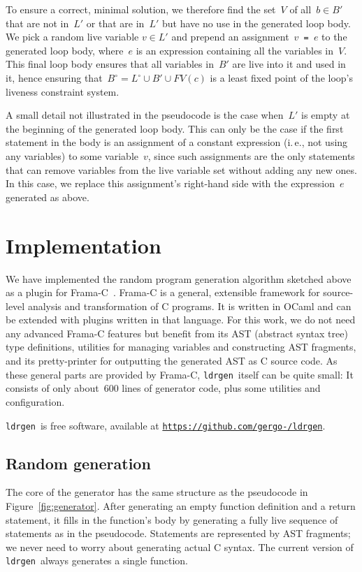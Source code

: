 \documentclass[a4paper]{easychair}
\newcommand\ldrgen{\texttt{ldrgen}}
\newcommand{\liveout}[1]{\ensuremath{#1^{\circ}}}
\def\union{\cup}
\begin{document}
To ensure a correct, minimal solution, we therefore find the set~\(V\) of
all~\(b \in B'\) that are not
in~\(L'\) or that are in~\(L'\) but have no use in the generated loop body.
We pick a random live variable \(v \in L'\) and prepend an
assignment~\(v\)\verb| = |\(e\) to the generated loop body, where~\(e\) is
an expression containing all the variables in~\(V\). This final loop body
ensures that all variables in~\(B'\) are live into it and used in it, hence
ensuring that~\(\liveout{B} = \liveout{L} \union B' \union FV(c)\) is a
least fixed point of the loop's liveness constraint system.

A small detail not illustrated in the pseudocode is the case when~\(L'\) is
empty at the beginning of the generated loop body. This can only be the case
if the first statement in the body is an assignment of a constant expression
(i.\,e., not using any variables) to some variable~\(v\), since such
assignments are the only statements that can remove variables from the live
variable set without adding any new ones. In this case, we replace this
assignment's right-hand side with the expression~\(e\) generated as above.


\section{Implementation}

We have implemented the random program generation algorithm sketched above
as a plugin for Frama-C~\cite{frama-c}. Frama-C is a general, extensible
framework for source-level analysis and transformation of C programs. It is
written in OCaml and can be extended with plugins written in that language.
For this work, we do not need any advanced Frama-C features but benefit from
its AST (abstract syntax tree) type definitions, utilities for managing
variables and constructing AST fragments, and its pretty-printer for
outputting the generated AST as C source code. As these general parts are
provided by Frama-C, \ldrgen\ itself can be quite small: It consists of only
about~600 lines of generator code, plus some utilities and configuration.

\ldrgen\ is free software, available at
\texttt{\url{https://github.com/gergo-/ldrgen}}.

\subsection{Random generation}

The core of the generator has the same structure as the pseudocode in
Figure~\ref{fig:generator}. After generating an empty function definition
and a return statement, it fills in the function's body by generating a
fully live sequence of statements as in the pseudocode. Statements are
represented by AST fragments; we never need to worry about generating actual
C syntax. The current version of \ldrgen\ always generates a single
function.
\end{document}
